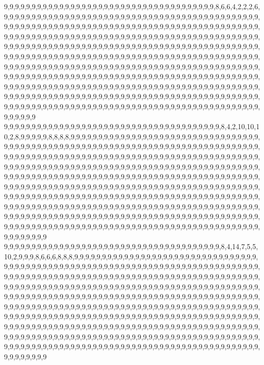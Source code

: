 9,9,9,9,9,9,9,9,9,9,9,9,9,9,9,9,9,9,9,9,9,9,9,9,9,9,9,9,9,9,9,9,9,9,9,9,9,9,8,6,6,4,2,2,2,6,9,9,9,9,9,9,9,9,9,9,9,9,9,9,9,9,9,9,9,9,9,9,9,9,9,9,9,9,9,9,9,9,9,9,9,9,9,9,9,9,9,9,9,9,9,9,9,9,9,9,9,9,9,9,9,9,9,9,9,9,9,9,9,9,9,9,9,9,9,9,9,9,9,9,9,9,9,9,9,9,9,9,9,9,9,9,9,9,9,9,9,9,9,9,9,9,9,9,9,9,9,9,9,9,9,9,9,9,9,9,9,9,9,9,9,9,9,9,9,9,9,9,9,9,9,9,9,9,9,9,9,9,9,9,9,9,9,9,9,9,9,9,9,9,9,9,9,9,9,9,9,9,9,9,9,9,9,9,9,9,9,9,9,9,9,9,9,9,9,9,9,9,9,9,9,9,9,9,9,9,9,9,9,9,9,9,9,9,9,9,9,9,9,9,9,9,9,9,9,9,9,9,9,9,9,9,9,9,9,9,9,9,9,9,9,9,9,9,9,9,9,9,9,9,9,9,9,9,9,9,9,9,9,9,9,9,9,9,9,9,9,9,9,9,9,9,9,9,9,9,9,9,9,9,9,9,9,9,9,9,9,9,9,9,9,9,9,9,9,9,9,9,9,9,9,9,9,9,9,9,9,9,9,9,9,9,9,9,9,9,9,9,9,9,9,9,9,9,9,9,9,9,9,9,9,9,9,9,9,9,9,9,9,9,9,9,9,9,9,9,9,9,9,9,9,9,9,9,9,9,9,9,9,9,9,9,9,9,9,9,9,9,9,9,9,9,9,9,9,9,9,9,9,9,9,9,9,9,9,9,9,9,9,9,9,9,9,9,9,9,9,9,9,9,9,9,9,9,9,9,9,9,9,9,9,9,9,9,9,9,9,9,9,9,9,9,9,9,9,9,9,9,9,9,9,9,9,9,9,9,9,9,9,9,9,9,9,9,9,9,9,9,9,9,9,9,9,9,9,9,9,9,9,9,9,9,9,9,9,9,9,9,9,9,9,9,9,9,9,9,9,9,9,9,9,9,9,9,9,9,9,9,9,9,9,9
9,9,9,9,9,9,9,9,9,9,9,9,9,9,9,9,9,9,9,9,9,9,9,9,9,9,9,9,9,9,9,9,9,9,9,9,9,9,9,8,4,2,10,10,10,2,8,9,9,9,9,9,8,8,8,8,9,9,9,9,9,9,9,9,9,9,9,9,9,9,9,9,9,9,9,9,9,9,9,9,9,9,9,9,9,9,9,9,9,9,9,9,9,9,9,9,9,9,9,9,9,9,9,9,9,9,9,9,9,9,9,9,9,9,9,9,9,9,9,9,9,9,9,9,9,9,9,9,9,9,9,9,9,9,9,9,9,9,9,9,9,9,9,9,9,9,9,9,9,9,9,9,9,9,9,9,9,9,9,9,9,9,9,9,9,9,9,9,9,9,9,9,9,9,9,9,9,9,9,9,9,9,9,9,9,9,9,9,9,9,9,9,9,9,9,9,9,9,9,9,9,9,9,9,9,9,9,9,9,9,9,9,9,9,9,9,9,9,9,9,9,9,9,9,9,9,9,9,9,9,9,9,9,9,9,9,9,9,9,9,9,9,9,9,9,9,9,9,9,9,9,9,9,9,9,9,9,9,9,9,9,9,9,9,9,9,9,9,9,9,9,9,9,9,9,9,9,9,9,9,9,9,9,9,9,9,9,9,9,9,9,9,9,9,9,9,9,9,9,9,9,9,9,9,9,9,9,9,9,9,9,9,9,9,9,9,9,9,9,9,9,9,9,9,9,9,9,9,9,9,9,9,9,9,9,9,9,9,9,9,9,9,9,9,9,9,9,9,9,9,9,9,9,9,9,9,9,9,9,9,9,9,9,9,9,9,9,9,9,9,9,9,9,9,9,9,9,9,9,9,9,9,9,9,9,9,9,9,9,9,9,9,9,9,9,9,9,9,9,9,9,9,9,9,9,9,9,9,9,9,9,9,9,9,9,9,9,9,9,9,9,9,9,9,9,9,9,9,9,9,9,9,9,9,9,9,9,9,9,9,9,9,9,9,9,9,9,9,9,9,9,9,9,9,9,9,9,9,9,9,9,9,9,9,9,9,9,9,9,9,9,9,9,9,9,9,9,9,9,9,9,9,9,9,9,9,9,9,9,9,9,9,9,9,9,9,9,9,9,9,9,9,9,9,9,9,9,9,9,9,9,9
9,9,9,9,9,9,9,9,9,9,9,9,9,9,9,9,9,9,9,9,9,9,9,9,9,9,9,9,9,9,9,9,9,9,9,9,9,9,9,8,4,14,7,5,5,10,2,9,9,9,8,6,6,6,8,8,8,9,9,9,9,9,9,9,9,9,9,9,9,9,9,9,9,9,9,9,9,9,9,9,9,9,9,9,9,9,9,9,9,9,9,9,9,9,9,9,9,9,9,9,9,9,9,9,9,9,9,9,9,9,9,9,9,9,9,9,9,9,9,9,9,9,9,9,9,9,9,9,9,9,9,9,9,9,9,9,9,9,9,9,9,9,9,9,9,9,9,9,9,9,9,9,9,9,9,9,9,9,9,9,9,9,9,9,9,9,9,9,9,9,9,9,9,9,9,9,9,9,9,9,9,9,9,9,9,9,9,9,9,9,9,9,9,9,9,9,9,9,9,9,9,9,9,9,9,9,9,9,9,9,9,9,9,9,9,9,9,9,9,9,9,9,9,9,9,9,9,9,9,9,9,9,9,9,9,9,9,9,9,9,9,9,9,9,9,9,9,9,9,9,9,9,9,9,9,9,9,9,9,9,9,9,9,9,9,9,9,9,9,9,9,9,9,9,9,9,9,9,9,9,9,9,9,9,9,9,9,9,9,9,9,9,9,9,9,9,9,9,9,9,9,9,9,9,9,9,9,9,9,9,9,9,9,9,9,9,9,9,9,9,9,9,9,9,9,9,9,9,9,9,9,9,9,9,9,9,9,9,9,9,9,9,9,9,9,9,9,9,9,9,9,9,9,9,9,9,9,9,9,9,9,9,9,9,9,9,9,9,9,9,9,9,9,9,9,9,9,9,9,9,9,9,9,9,9,9,9,9,9,9,9,9,9,9,9,9,9,9,9,9,9,9,9,9,9,9,9,9,9,9,9,9,9,9,9,9,9,9,9,9,9,9,9,9,9,9,9,9,9,9,9,9,9,9,9,9,9,9,9,9,9,9,9,9,9,9,9,9,9,9,9,9,9,9,9,9,9,9,9,9,9,9,9,9,9,9,9,9,9,9,9,9,9,9,9,9,9,9,9,9,9,9,9,9,9,9,9,9,9,9,9,9,9,9,9,9,9,9,9,9,9,9,9,9,9,9,9,9,9,9,9,9
